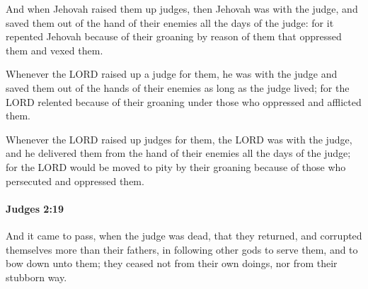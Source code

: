 			\begin{versebox}
					\item[BHS] 
					\item[ASV] And when Jehovah raised them up judges, then Jehovah was with the judge, and saved them out of the hand of their enemies all the days of the judge: for it repented Jehovah because of their groaning by reason of them that oppressed them and vexed them.
					\item[NIV] Whenever the LORD raised up a judge for them, he was with the judge and saved them out of the hands of their enemies as long as the judge lived; for the LORD relented because of their groaning under those who oppressed and afflicted them.
					\item[NRSV] Whenever the LORD raised up judges for them, the LORD was with the judge, and he delivered them from the hand of their enemies all the days of the judge; for the LORD would be moved to pity by their groaning because of those who persecuted and oppressed them.
			\end{versebox}

		\paragraph{Judges 2:19} %
			\label{JUDGES-2-19}

			And it came to pass, when the judge was dead, that they returned, and corrupted themselves more than their fathers, in following other gods to serve them, and to bow down unto them; they ceased not from their own doings, nor from their stubborn way.

